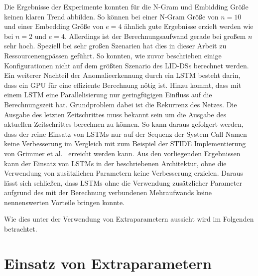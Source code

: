 Die Ergebnisse der Experimente konnten für die N-Gram und Embidding Größe keinen klaren Trend abbilden.
So können bei einer N-Gram Größe von $n=10$ und einer Embedding Größe von $e=4$ ähnlich gute Ergebnisse erzielt werden wie bei $n=2$ und $e=4$.
Allerdings ist der Berechnungsaufwand gerade bei großem $n$ sehr hoch.
Speziell bei sehr großen Szenarien hat dies in dieser Arbeit zu Ressourcenengpässen geführt.
So konnten, wie zuvor beschrieben einige Konfigurationen nicht auf dem größten Szenario des \acp{LID-DS} berechnet werden.
Ein weiterer Nachteil der Anomalieerkennung durch ein \ac{LSTM} besteht darin, dass ein GPU für eine effiziente Berechnung nötig ist.
Hinzu kommt, dass mit einem \ac{LSTM} eine Parallelisierung nur geringfügigen Einfluss auf die Berechnungszeit hat.
Grundproblem dabei ist die Rekurrenz des Netzes. 
Die Ausgabe des letzten Zeitschrittes muss bekannt sein um die Ausgabe des aktuellen Zeitschrittes berechnen zu können.
So kann daraus gefolgert werden, dass der reine Einsatz von \acp{LSTM} nur auf der Sequenz der System Call Namen keine Verbesserung im Vergleich mit zum Beispiel der \ac{STIDE} Implementierung von Grimmer et al.~\cite{IDSTHREADGRIMMER2021} erreicht werden kann.
Aus den vorliegenden Ergebnissen kann der Einsatz von \acp{LSTM} in der beschriebenen Architektur, ohne die Verwendung von zusätzlichen Parametern keine Verbesserung erzielen.
Daraus lässt sich schließen, dass \acp{LSTM} ohne die Verwendung zusätzlicher Parameter aufgrund des mit der Berechnung verbundenen Mehraufwands keine nennenswerten Vorteile bringen konnte.

Wie dies unter der Verwendung von Extraparametern aussieht wird im Folgenden betrachtet.

\section{Einsatz von Extraparametern}\label{sec:folgerungen_extra}

